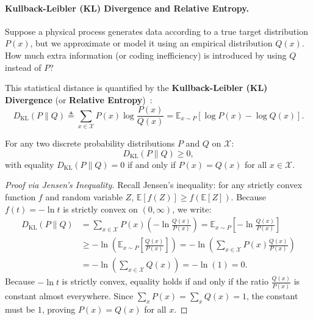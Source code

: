 \paragraph{Kullback-Leibler (KL) Divergence and Relative Entropy.}
Suppose a physical process generates data according to a true target distribution $P(x)$, but we approximate or model it using an empirical distribution $Q(x)$. How much extra information (or coding inefficiency) is introduced by using $Q$ instead of $P$?

This statistical distance is quantified by the \textbf{Kullback-Leibler (KL) Divergence} (or \textbf{Relative Entropy})~\cite{kullback1951information}:
\begin{equation}
D_{\text{KL}}(P \parallel Q) \triangleq \sum_{x \in \mathcal{X}} P(x) \log \frac{P(x)}{Q(x)} = \mathbb{E}_{x \sim P}\left[ \log P(x) - \log Q(x) \right].
\label{eq:kl_divergence_def}
\end{equation}

\begin{theorem}
For any two discrete probability distributions $P$ and $Q$ on $\mathcal{X}$:
\begin{equation}
D_{\text{KL}}(P \parallel Q) \ge 0,
\label{eq:gibbs_inequality}
\end{equation}
with equality $D_{\text{KL}}(P \parallel Q) = 0$ if and only if $P(x) = Q(x)$ for all $x \in \mathcal{X}$.
\end{theorem}

\begin{proof}[Proof via Jensen's Inequality]
Recall Jensen's inequality: for any strictly convex function $f$ and random variable $Z$, $\mathbb{E}[f(Z)] \ge f(\mathbb{E}[Z])$. Because $f(t) = -\ln t$ is strictly convex on $(0, \infty)$, we write:
\begin{align}
D_{\text{KL}}(P \parallel Q) &= \sum_{x \in \mathcal{X}} P(x) \left( -\ln \frac{Q(x)}{P(x)} \right) = \mathbb{E}_{x \sim P}\left[ -\ln \frac{Q(x)}{P(x)} \right] \nonumber \\
&\ge -\ln \left( \mathbb{E}_{x \sim P}\left[ \frac{Q(x)}{P(x)} \right] \right) = -\ln \left( \sum_{x \in \mathcal{X}} P(x) \frac{Q(x)}{P(x)} \right) \nonumber \\
&= -\ln \left( \sum_{x \in \mathcal{X}} Q(x) \right) = -\ln(1) = 0.
\end{align}
Because $-\ln t$ is strictly convex, equality holds if and only if the ratio $\frac{Q(x)}{P(x)}$ is constant almost everywhere. Since $\sum_x P(x) = \sum_x Q(x) = 1$, the constant must be $1$, proving $P(x) = Q(x)$ for all $x$.
\end{proof}

